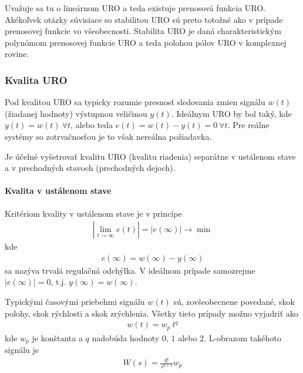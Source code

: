 \documentclass[a4paper, 10pt, ]{article}
\begin{document}
Uvažuje sa tu o lineárnom URO a teda existuje prenosová funkcia URO. Akékoľvek otázky súvisiace so stabilitou URO sú preto totožné ako v prípade prenosovej funkcie vo všeobecnosti. Stabilita URO je daná charakteristickým polynómom prenosovej funkcie URO a teda polohou pólov URO v komplexnej rovine.


\subsubsection{Kvalita URO}

Pod kvalitou URO sa typicky rozumie presnosť sledovania zmien signálu $w(t)$ (žiadanej hodnoty) výstupnou veličinou $y(t)$. Ideálnym URO by bol taký, kde $y(t) = w(t) \  \forall t$, alebo teda $e(t) = w(t) - y(t) = 0  \  \forall t$.
Pre reálne systémy so zotrvačnosťou je to však nereálna požiadavka.

Je účelné vyšetrovať kvalitu URO (kvalitu riadenia) separátne v ustálenom stave a v prechodných stavoch (prechodných dejoch).

\paragraph{Kvalita v ustálenom stave}

Kritériom kvality v ustálenom stave je v princípe
\begin{align}
    \left| \lim_{t \to \infty} e(t) \right| = \left| e(\infty) \right| \to \min
\end{align}
kde
\begin{align}
    e(\infty) = w(\infty) - y(\infty)
\end{align}
sa nazýva trvalá regulačná odchýlka. V ideálnom prípade samozrejme $\left| e(\infty) \right| = 0$, t.j. $y(\infty) = w(\infty)$.


Typickými časovými priebehmi signálu $w(t)$ sú, zovšeobecnene povedané, skok polohy, skok rýchlosti a skok zrýchlenia. Všetky tieto prípady možno vyjadriť ako
\begin{align}
    w(t) = w_p \ t^q
\end{align}
kde $w_p$ je konštanta a $q$ nadobúda hodnoty $0$, $1$ alebo $2$. L-obrazom takéhoto signálu je
\begin{align}
    W(s) = \frac{q!}{s^{q+1}}w_p
\end{align}
\end{document}
